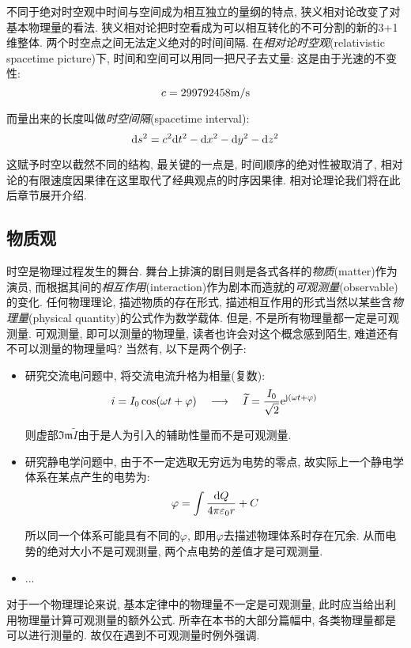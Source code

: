 不同于绝对时空观中时间与空间成为相互独立的量纲的特点, 狭义相对论改变了对基本物理量的看法. 狭义相对论把时空看成为可以相互转化的不可分割的新的3+1维整体. 两个时空点之间无法定义绝对的时间间隔. 在\emph{相对论时空观}(relativistic spacetime picture)下, 时间和空间可以用同一把尺子去丈量: 这是由于光速的不变性:
\[c=299792458{\rm m/s}\]

而量出来的长度叫做\emph{时空间隔}(spacetime interval):
\[\textrm{d} s^2=c^2\textrm{d} t^2-\textrm{d} x^2-\textrm{d} y^2-\textrm{d} z^2\]

这赋予时空以截然不同的结构, 最关键的一点是, 时间顺序的绝对性被取消了, 相对论的有限速度因果律在这里取代了经典观点的时序因果律. 相对论理论我们将在此后章节展开介绍.

\subsection{物质观}\label{2-1-2}

时空是物理过程发生的舞台. 舞台上排演的剧目则是各式各样的\emph{物质}(matter)作为演员, 而根据其间的\emph{相互作用}(interaction)作为剧本而造就的\emph{可观测量}(observable)的变化. 任何物理理论, 描述物质的存在形式, 描述相互作用的形式当然以某些含\emph{物理量}(physical quantity)的公式作为数学载体. 但是, 不是所有物理量都一定是可观测量. 可观测量, 即可以测量的物理量, 读者也许会对这个概念感到陌生, 难道还有不可以测量的物理量吗? 当然有, 以下是两个例子:
\begin{itemize}
	\item 研究交流电问题中, 将交流电流升格为相量(复数):
	\[i=I_0\cos(\omega t+\varphi) \quad \longrightarrow \quad \widetilde{I}=\frac{I_0}{\sqrt{2}}{\rm e}^{{\rm j} \left(\omega t+\varphi\right)}\]

	则虚部$\mathfrak{Im}\widetilde{I}$由于是人为引入的辅助性量而不是可观测量.

	\item 研究静电学问题中, 由于不一定选取无穷远为电势的零点, 故实际上一个静电学体系在某点产生的电势为:
	\[\varphi=\int\frac{\textrm{d} Q}{4\pi\varepsilon_0 r}+C\]

	所以同一个体系可能具有不同的$\varphi$, 即用$\varphi$去描述物理体系时存在冗余. 从而电势的绝对大小不是可观测量, 两个点电势的差值才是可观测量.

	\item ...

\end{itemize}

对于一个物理理论来说, 基本定律中的物理量不一定是可观测量, 此时应当给出利用物理量计算可观测量的额外公式. 所幸在本书的大部分篇幅中, 各类物理量都是可以进行测量的. 故仅在遇到不可观测量时例外强调.

